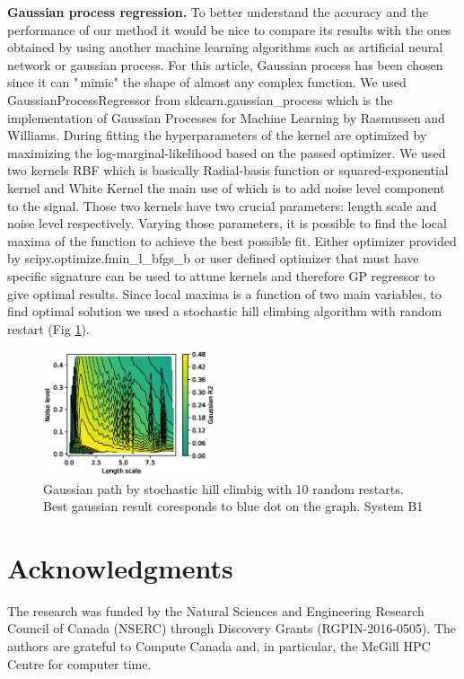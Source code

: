 \documentclass[aip,jcp,reprint,amsmath,amssymb,nature]{revtex4-1}
\begin{document}
\textbf{Gaussian process regression. }To better understand the 
accuracy and the performance of our method it would be nice to compare 
its results with the ones obtained by using another machine learning 
algorithms such as artificial neural network or gaussian process. For 
this article, Gaussian process has been chosen since it can "\,mimic" 
the shape of almost any complex function. We used 
GaussianProcessRegressor from sklearn.gaussian\_process which is the 
implementation of Gaussian Processes for Machine Learning by Rasmussen 
and Williams. During fitting the hyperparameters of the kernel are 
optimized by maximizing the log-marginal-likelihood based on the passed 
optimizer. We used two kernels RBF which is basically Radial-basis 
function or squared-exponential kernel and White Kernel the main use of 
which is to add noise level component to the signal. Those two kernels 
have two crucial parameters: length scale and noise level respectively. 
Varying those parameters, it is possible to find the local maxima of the 
function to achieve the best possible fit. Either optimizer provided by 
scipy.optimize.fmin\_l\_bfgs\_b or user defined optimizer that must have 
specific signature can be used to attune kernels and therefore GP 
regressor to give optimal results. Since local maxima is a function of two main variables, to find optimal solution we used a stochastic hill climbing algorithm with random restart (Fig \ref{Fig:B1_Gaussian_path}). 

\begin{figure}
\includegraphics[width=0.45\textwidth]{media/B1_Gaussian_path.eps}
\caption{Gaussian path by stochastic hill climbig with 10 random restarts. Best gaussian result coresponds to blue dot on the graph. System B1}\label{Fig:B1_Gaussian_path}
\end{figure}

\section{Acknowledgments} 

The research was funded by the Natural Sciences and Engineering Research Council of Canada (NSERC) through Discovery
Grants (RGPIN-2016-0505). The authors are grateful to Compute Canada and, in particular, the McGill HPC Centre for computer time.
\end{document}
